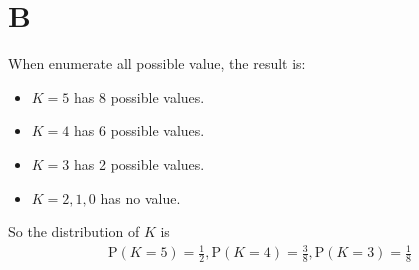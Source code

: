\documentclass[11pt]{article}
\renewcommand{\P}{\mbox{P}}
\begin{document}
	\section*{B}
	When enumerate all possible value, the result is:
	\begin{itemize}
		\item $ K=5 $ has 8 possible values.
		\item $ K=4 $ has 6 possible values.
		\item $ K=3 $ has 2 possible values.
		\item $ K=2,1,0$ has no value.
	\end{itemize}
	So the distribution of $ K $ is
	\begin{align*}
		\P(K=5) = \frac{1}{2}, \P(K=4) = \frac{3}{8}, \P(K=3) = \frac{1}{8}
	\end{align*}
\end{document}
